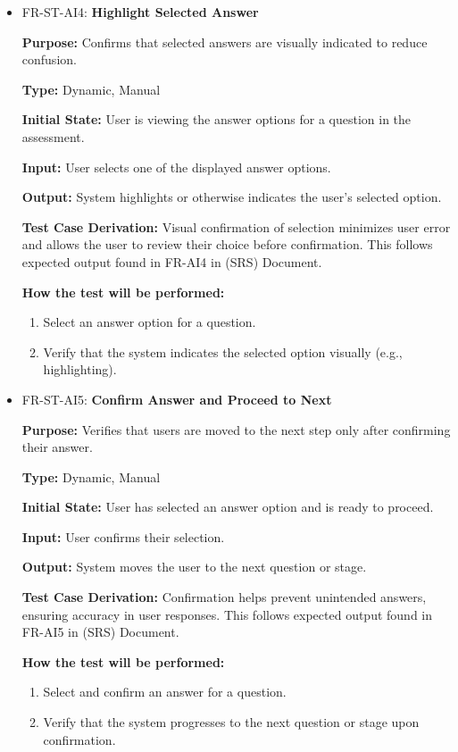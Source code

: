 \documentclass[12pt, titlepage]{article}
\begin{document}
\begin{itemize}
  \item FR-ST-AI4: \textbf{Highlight Selected Answer}
  \begin{mdframed}[linewidth=0.5mm]
      \textbf{Purpose:} Confirms that selected answers are visually indicated to reduce confusion. \par
      \textbf{Type:} Dynamic, Manual \par
      \textbf{Initial State:} User is viewing the answer options for a question in the assessment. \par
      \textbf{Input:} User selects one of the displayed answer options. \par
      \textbf{Output:} System highlights or otherwise indicates the user’s selected option. \par
      \textbf{Test Case Derivation:} Visual confirmation of selection minimizes user error and allows
       the user to review their choice before confirmation. 
       This follows expected output found in FR-AI4 in (SRS) Document. \par
      \textbf{How the test will be performed:}
      \begin{enumerate}[noitemsep]
        \item Select an answer option for a question.
        \item Verify that the system indicates the selected option visually (e.g., highlighting).
      \end{enumerate}
  \end{mdframed}

  \item FR-ST-AI5: \textbf{Confirm Answer and Proceed to Next}
  \begin{mdframed}[linewidth=0.5mm]
      \textbf{Purpose:} Verifies that users are moved to the next step only after confirming their answer. \par
      \textbf{Type:} Dynamic, Manual \par
      \textbf{Initial State:} User has selected an answer option and is ready to proceed. \par
      \textbf{Input:} User confirms their selection. \par
      \textbf{Output:} System moves the user to the next question or stage. \par
      \textbf{Test Case Derivation:} Confirmation helps prevent unintended answers, ensuring 
      accuracy in user responses. This follows expected output found in FR-AI5 in (SRS) Document. \par
      \textbf{How the test will be performed:}
      \begin{enumerate}[noitemsep]
        \item Select and confirm an answer for a question.
        \item Verify that the system progresses to the next question or stage upon \\ confirmation.
      \end{enumerate}
  \end{mdframed}


\end{itemize}
\end{document}
